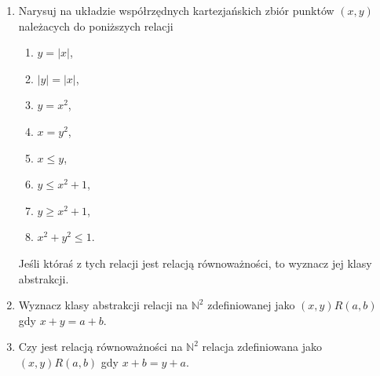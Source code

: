 \documentclass[12pt]{article}
\newcommand{\bN}{\mathbb{N}}
\begin{document}
\begin{enumerate}
	\item 
	Narysuj na układzie współrzędnych kartezjańskich zbiór punktów $(x,y)$
	należacych do poniższych relacji
	\begin{enumerate}
		\item $y=|x|$,
	\item $|y|=|x|$,
	\item $y=x^2$,
	\item $x=y^2$,
	\item $x\leq y$,
	\item $y\leq x^2+1$,
	\item $y\geq x^2+1$,
	\item $x^2+y^2\leq 1$.
\end{enumerate}
Jeśli któraś z tych relacji jest relacją równoważności, to wyznacz
jej klasy abstrakcji.

\item 
Wyznacz klasy abstrakcji relacji na $\bN^2$ zdefiniowanej jako
$(x,y)R(a,b)$ gdy $x+y=a+b$.

\item 
Czy jest relacją równoważności na $\bN^2$ relacja zdefiniowana jako
$(x,y)R(a,b)$ gdy $x+b = y+a$.



\end{enumerate}
\end{document}
